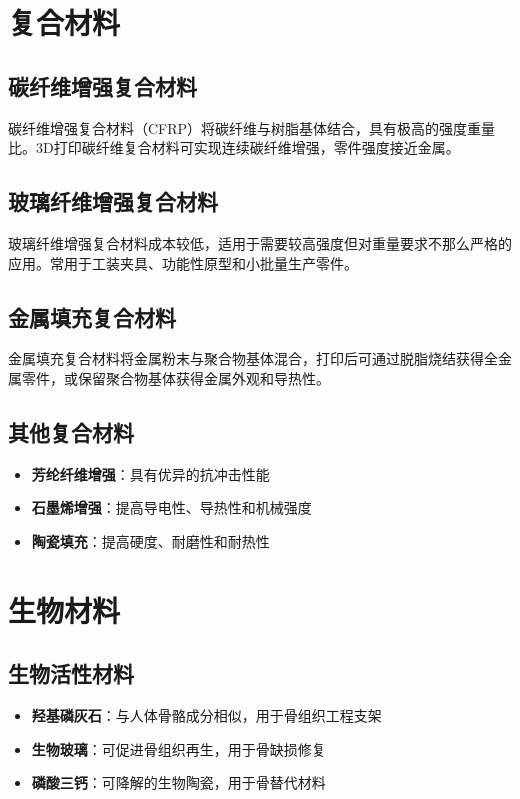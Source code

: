 \documentclass[12pt,UTF8]{ctexbook}
\begin{document}
\section{复合材料}

\subsection{碳纤维增强复合材料}
碳纤维增强复合材料（CFRP）将碳纤维与树脂基体结合，具有极高的强度重量比。3D打印碳纤维复合材料可实现连续碳纤维增强，零件强度接近金属。

\subsection{玻璃纤维增强复合材料}
玻璃纤维增强复合材料成本较低，适用于需要较高强度但对重量要求不那么严格的应用。常用于工装夹具、功能性原型和小批量生产零件。

\subsection{金属填充复合材料}
金属填充复合材料将金属粉末与聚合物基体混合，打印后可通过脱脂烧结获得全金属零件，或保留聚合物基体获得金属外观和导热性。

\subsection{其他复合材料}
\begin{itemize}
\item \textbf{芳纶纤维增强}：具有优异的抗冲击性能
\item \textbf{石墨烯增强}：提高导电性、导热性和机械强度
\item \textbf{陶瓷填充}：提高硬度、耐磨性和耐热性
\end{itemize}

\section{生物材料}

\subsection{生物活性材料}
\begin{itemize}
\item \textbf{羟基磷灰石}：与人体骨骼成分相似，用于骨组织工程支架
\item \textbf{生物玻璃}：可促进骨组织再生，用于骨缺损修复
\item \textbf{磷酸三钙}：可降解的生物陶瓷，用于骨替代材料
\end{itemize}
\end{document}
